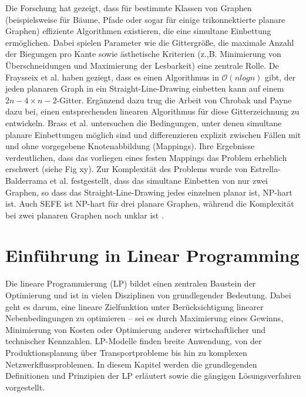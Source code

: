 \documentclass[bachelor, german]{algothesis}
\begin{document}
Die Forschung hat gezeigt, dass für bestimmte Klassen von Graphen (beispielsweise für Bäume, Pfade oder sogar für einige trikonnektierte planare Graphen) effiziente Algorithmen existieren, die eine simultane Einbettung ermöglichen. Dabei spielen Parameter wie die Gittergröße, die maximale Anzahl der Biegungen pro Kante sowie ästhetische Kriterien (z.,B. Minimierung von Überschneidungen und Maximierung der Lesbarkeit) eine zentrale Rolle.\newline
De Fraysseix et al. \cite{DeFraysseix1990} haben geziegt, dass es einen Algorithmus in $\mathcal{O}(nlogn)$ gibt, der jeden planaren Graph in ein Straight-Line-Drawing einbetten kann auf einem $2n-4\times n-2$-Gitter. Ergänzend dazu trug die Arbeit von Chrobak und Payne \cite{CHROBAK1995241} dazu bei, einen entsprechenden linearen Algorithmus für diese Gitterzeichnung zu entwickeln.\newline
Brass et al. \cite{BRASS2007117}  untersuchen die Bedingungen, unter denen simultane planare Einbettungen möglich sind und differenzieren explizit zwischen Fällen mit und ohne vorgegebene Knotenabbildung (Mappings). Ihre Ergebnisse verdeutlichen, dass das vorliegen eines festen Mappings das Problem erheblich erschwert (siehe Fig xy).\newline
Zur Komplexität des Problems wurde von Estrella-Balderrama et al.\cite{Estrella} festgestellt, dass das simultane Einbetten von nur zwei Graphen, so dass das Straight-Line-Drawing jedes einzelnen planar ist, NP-hart ist. Auch SEFE ist NP-hart für drei planare Graphen, während die Komplexität bei zwei planaren Graphen noch unklar ist \cite{Gassner}. 

\section{Einführung in Linear Programming}
Die lineare Programmierung (LP) bildet einen zentralen Baustein der Optimierung und ist in vielen Disziplinen von grundlegender Bedeutung. Dabei geht es darum, eine lineare Zielfunktion unter Berücksichtigung linearer Nebenbedingungen zu optimieren – sei es durch Maximierung eines Gewinns, Minimierung von Kosten oder Optimierung anderer wirtschaftlicher und technischer Kennzahlen.\newline
LP-Modelle finden breite Anwendung, von der Produktionsplanung über Transportprobleme bis hin zu komplexen Netzwerkflussproblemen. In diesem Kapitel werden die grundlegenden Definitionen und Prinzipien der LP erläutert sowie die gängigen Lösungsverfahren vorgestellt.
\end{document}
